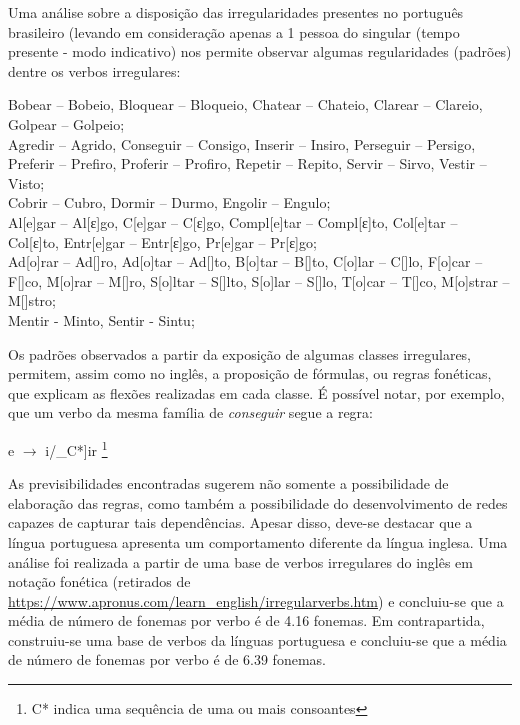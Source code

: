 Uma análise sobre a disposição das irregularidades presentes no português brasileiro (levando em consideração apenas a 1 pessoa do singular (tempo presente - modo indicativo) nos permite observar algumas regularidades (padrões) dentre os verbos irregulares:\\

\begin{center}

Bobear – Bobeio, Bloquear – Bloqueio, Chatear – Chateio, Clarear – Clareio, Golpear – Golpeio;\\

Agredir – Agrido, Conseguir – Consigo, Inserir – Insiro, Perseguir – Persigo, Preferir – Prefiro, Proferir – Profiro, Repetir – Repito, Servir –  Sirvo, Vestir – Visto;\\

Cobrir – Cubro, Dormir – Durmo, Engolir – Engulo;\\

 Al[e]gar – Al[ε]go, C[e]gar – C[ε]go, Compl[e]tar – Compl[ε]to,  Col[e]tar – Col[ε]to, Entr[e]gar – Entr[ε]go, Pr[e]gar – Pr[ε]go;\\

Ad[o]rar – Ad[\textopeno]ro, Ad[o]tar – Ad[\textopeno]to, B[o]tar – B[\textopeno]to, C[o]lar – C[\textopeno]lo, F[o]car – F[\textopeno]co, M[o]rar – M[\textopeno]ro, S[o]ltar – S[\textopeno]lto, S[o]lar – S[\textopeno]lo, T[o]car – T[\textopeno]co, M[o]strar – M[\textopeno]stro;\\

Mentir - Minto, Sentir - Sintu;

\end{center}

Os padrões observados a partir da exposição de algumas classes irregulares, permitem, assim como no inglês, a proposição de fórmulas, ou regras fonéticas, que explicam as flexões realizadas em cada classe. É possível notar, por exemplo, que um verbo da mesma família de \textit{conseguir} segue a regra:

\begin{center}
e $\rightarrow$ i/\_C*]ir \footnote{C* indica uma sequência de uma ou mais consoantes}
\end{center}


As previsibilidades encontradas sugerem não somente a possibilidade de elaboração das regras, como também a possibilidade do desenvolvimento de redes capazes de capturar tais dependências. Apesar disso, deve-se destacar que a língua portuguesa apresenta um comportamento diferente da língua inglesa. Uma análise foi realizada a partir de uma base de verbos irregulares do inglês em notação fonética (retirados de \url{https://www.apronus.com/learn_english/irregularverbs.htm}) e concluiu-se que a média de número de fonemas por verbo é de 4.16 fonemas. Em contrapartida, construiu-se uma base de verbos da línguas portuguesa e concluiu-se que a média de número de fonemas por verbo é de 6.39 fonemas.

